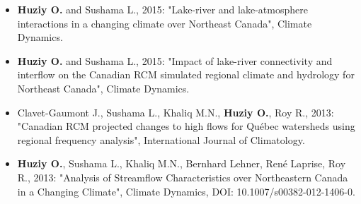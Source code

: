 \vspace{\vertspace}


{
\renewcommand{\labelitemi}{}
\begin{itemize}

    \item \textbf{Huziy O.} and Sushama L., 2015: "Lake-river and
    lake-atmosphere interactions in a changing climate over Northeast Canada",
    Climate Dynamics.

    \item \textbf{Huziy O.} and Sushama L., 2015: "Impact of lake-river
    connectivity and interflow on the Canadian RCM simulated regional climate
    and hydrology for Northeast Canada", Climate Dynamics.

    \item Clavet-Gaumont J., Sushama L., Khaliq M.N.,
    \textbf{Huziy O.}, Roy R., 2013: "Canadian RCM projected changes to high
    flows for Québec watersheds using regional frequency analysis", International Journal of Climatology.

    \item \textbf{Huziy O.}, Sushama L., Khaliq M.N., Bernhard
    Lehner, René Laprise, Roy R., 2013: "Analysis of Streamflow Characteristics over Northeastern Canada
     in a Changing Climate", Climate Dynamics, DOI:
     10.1007/s00382-012-1406-0.

\end{itemize}
}
